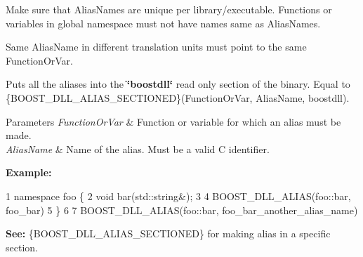 Make sure that Alias\+Names are unique per library/executable. Functions or variables in global namespace must not have names same as Alias\+Names.

Same Alias\+Name in different translation units must point to the same Function\+Or\+Var.

Puts all the aliases into the {\bfseries \char`\"{}boostdll\char`\"{}} read only section of the binary. Equal to \{B\+O\+O\+S\+T\+\_\+\+D\+L\+L\+\_\+\+A\+L\+I\+A\+S\+\_\+\+S\+E\+C\+T\+I\+O\+N\+ED\}(Function\+Or\+Var, Alias\+Name, boostdll).


\begin{DoxyParams}{Parameters}
{\em Function\+Or\+Var} & Function or variable for which an alias must be made. \\
\hline
{\em Alias\+Name} & Name of the alias. Must be a valid C identifier.\\
\hline
\end{DoxyParams}
{\bfseries Example\+:} 
\begin{DoxyCode}
1 namespace foo \{
2   void bar(std::string&);
3 
4   BOOST\_DLL\_ALIAS(foo::bar, foo\_bar)
5 \}
6 
7 BOOST\_DLL\_ALIAS(foo::bar, foo\_bar\_another\_alias\_name)
\end{DoxyCode}


{\bfseries See\+:} \{B\+O\+O\+S\+T\+\_\+\+D\+L\+L\+\_\+\+A\+L\+I\+A\+S\+\_\+\+S\+E\+C\+T\+I\+O\+N\+ED\} for making alias in a specific section. 

